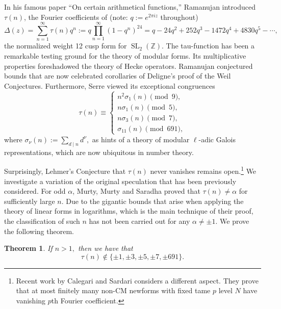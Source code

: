 \documentclass[12pt]{amsart}
\newtheorem{thm}{Theorem}[section]
\newcommand{\Z}{\mathbb{Z}}
\newcommand{\SL}{\operatorname{SL}}
\numberwithin{equation}{section}
\begin{document}
In his famous paper ``On certain arithmetical functions,'' Ramanujan introduced $\tau(n)$, the  Fourier coefficients of 
 (note: $q:=e^{2\pi i z}$ throughout)
\begin{equation}
\Delta(z)=\sum_{n=1}^{\infty}\tau(n)q^n:=q\prod_{n=1}^{\infty}(1-q^n)^{24}=q-24q^2+252q^3-1472q^4+4830q^5-\cdots,
\end{equation}
the normalized weight 12 cusp form for $\SL_2(\Z)$.
The tau-function has been a remarkable testing ground for the theory of modular forms.
Its multiplicative properties foreshadowed the theory of Hecke operators. Ramanujan conjectured bounds that are now celebrated corollaries of
Deligne's proof of the Weil Conjectures. Furthermore, Serre \cite{SerreRamanujan}  viewed its exceptional congruences \cite{RamanujanUnpublished, Ramanujan}
\begin{equation}\label{RamanujanCongruences}
\tau(n)\equiv \begin{cases} n^2\sigma_1(n)\!\!\!\!\!\pmod 9,\\
 n\sigma_1(n)\!\!\!\pmod 5,\\
n\sigma_3(n)\!\!\!\pmod 7,\\
\sigma_{11}(n)\!\!\pmod{691},
\end{cases}
\end{equation}
where $\sigma_\nu(n):=\sum_{d\mid n}d^{\nu},$
 as hints of a theory of modular $\ell$-adic Galois representations, which are now ubiquitous in number theory.

Surprisingly, Lehmer's Conjecture \cite{Lehmer} that $\tau(n)$ never vanishes remains open.\footnote{Recent work by Calegari and Sardari \cite{CalegariSardari} considers a different aspect. They prove that
 at most finitely many non-CM newforms with fixed tame $p$ level $N$ have vanishing $p$th Fourier coefficient.}
 We investigate a variation of the original speculation that has been previously considered. For odd $\alpha$,
 Murty, Murty and Saradha \cite{MMS} proved that
 $\tau(n)\neq \alpha$ for sufficiently large $n$. 
 Due to the gigantic bounds that  arise when applying the theory of linear forms in logarithms, which is the main technique of their proof, the classification
 of such $n$ has not been carried out for any $\alpha\neq \pm 1$. 
 We prove the following theorem.
 
\begin{thm}\label{Lehmer135}
If  $n>1,$ then we have that
$$
\tau(n) \not \in \{\pm 1, \pm 3, \pm 5, \pm 7, \pm 691\}.
$$
\end{thm}
\end{document}
